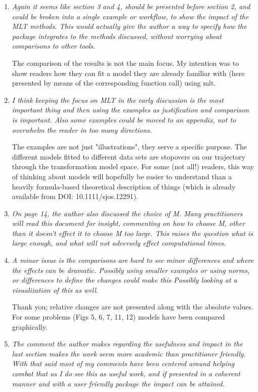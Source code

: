\documentclass[12pt]{article}
\begin{document}
\begin{enumerate}
\item \textit{Again it seems like section 3 and 4, should be presented
before section 2, and could be broken into a single example or workflow, to
show the impact of the MLT methods.  This would actually give the author a
way to specify how the package integrates to the methods discussed, without
worrying about comparisons to other tools.}

The comparison of the results is not the main focus. My intention was to
show readers how they can fit a model they are already familiar with (here
presented by means of the corresponding function call) using mlt.

\item \textit{I think keeping the focus on MLT
in the early discussion is the most important thing and then using the
examples as justification and comparison is important.  Also some examples
could be moved to an appendix, not to overwhelm the reader in too many
directions.  }

The examples are not just "illustrations", they serve a specific purpose.
The different models fitted to different data sets are stopovers on our
trajectory through the transformation model space. For some (not all!)
readers, this way of thinking about models will hopefully be easier to
understand than a heavily formula-based theoretical description of things
(which is already available from DOI: 10.1111/sjos.12291).

\item \textit{On page 14, the author also discussed the choice of M.  Many
practitioners will read this document for insight, commenting on how to
choose  M, other than it doesn't effect it to choose M too large.  This
raises the question what is large enough, and what will not adversely effect
computational times.  }

\item \textit{A minor issue is the comparisons are hard to see minor
differences and where the effects can be dramatic.  Possibly using smaller
examples or using norms, or differences to define the changes could make
this   Possibly looking at a visualization of this as well.  }

Thank you; relative changes are not presented along with the absolute
values.  For some problems (Figs 5, 6, 7, 11, 12) models have been compared
graphically.

\item \textit{The comment the author makes regarding the usefulness and
impact in the last section makes the work seem more academic than
practitioner friendly.  With that said most of my comments have been
centered around helping combat that as I do see this as useful work, and if
presented in a coherent manner and with a user friendly package the impact
can be attained.  }


\end{enumerate}
\end{document}
